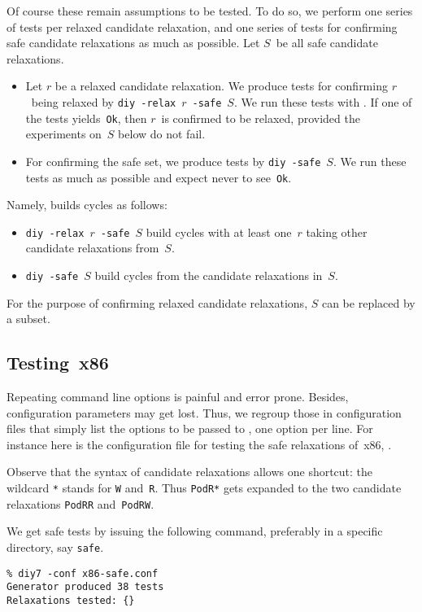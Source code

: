 Of course these remain assumptions to be tested.
To do so, we perform one series of tests per relaxed candidate relaxation,
and one series of tests for confirming safe candidate relaxations
as much as possible. Let $S$~be all safe candidate relaxations.
\begin{itemize}
\item Let $r$ be a relaxed candidate relaxation.
We produce tests for confirming $r$~being relaxed by
\texttt{diy -relax}~$r$~\texttt{-safe}~$S$.
We run these tests with \litmus{}. If one of the tests yields~\texttt{Ok},
then $r$~is confirmed to be relaxed, provided the experiments on~$S$ below
do not  fail.
\item For confirming the safe set, we produce tests
by \texttt{diy -safe}~$S$.
We run these tests as much as possible and expect never to see~\texttt{Ok}.
\end{itemize}
\label{diy:one:relax}Namely, \diy{} builds cycles as follows:
\begin{itemize}
\item \texttt{diy -relax}~$r$~\texttt{-safe}~$S$ build cycles
with at least one~$r$ taking other candidate relaxations from~$S$.
\item \texttt{diy -safe}~$S$ build cycles from the candidate relaxations in~$S$.
\end{itemize}
For the purpose of confirming relaxed
candidate relaxations, $S$ can be replaced by a subset.

\subsection{Testing~x86}
Repeating command line options is painful and error prone.
Besides, configuration parameters may get lost.
Thus, we regroup those in configuration files
that simply list the options to be passed to \diy, one option per line.
For instance here is the configuration file for testing the safe relaxations
of~x86, .

Observe that the syntax of candidate relaxations allows one shortcut:
the wildcard \texttt{*} stands for \texttt{W} and~\texttt{R}.
Thus \texttt{PodR*} gets expanded  to the two candidate
relaxations \texttt{PodRR} and~\texttt{PodRW}.

\label{safe:test:sec}%
We get safe tests by issuing the following command, preferably in a
specific directory, say \texttt{safe}.
\begin{verbatim}
% diy7 -conf x86-safe.conf
Generator produced 38 tests
Relaxations tested: {}
\end{verbatim}

